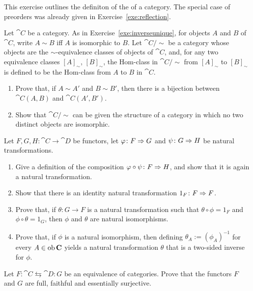   

\begin{exercise}\label{exe:skeleton}
This exercise outlines the definiton of the  of a category. The special case of preorders was already given in Exercise~\ref{exe:reflection}.

Let $\cat{C}$ be a category. As in Exercise~\ref{exe:inverseunique}, for objects $A$ and $B$ of $\cat{C}$, write $A \sim B$ iff $A$ is isomorphic to $B$. Let $\cat{C}/{\sim}$ be a category whose objects are the ${\sim}$-equivalence classes of objects of $\cat{C}$, and, for any two equivalence classes $[A]_{\sim}$, $[B]_{\sim}$, the Hom-class in $\cat{C}/{\sim}$ from $[A]_{\sim}$ to $[B]_{\sim}$ is defined to be the Hom-class from $A$ to $B$ in $\cat{C}$.
\begin{enumerate}
\item Prove that, if $A \sim A'$ and $B \sim B'$, then there is a bijection between $\cat{C}(A,B)$ and $\cat{C}(A',B')$. %
\item Show that $\cat{C}/{\sim}$ can be given the structure of a category in which no two distinct objects are isomorphic.
\end{enumerate}
\end{exercise}


\begin{exercise}\label{exe:naturaliso}
  Let $F, G, H \colon \cat{C} \to \cat{D}$ be functors, let $\varphi \colon F \Rightarrow G$ and $\psi \colon G \Rightarrow H$ be natural transformations.
  \begin{enumerate}
  \item Give a definition of the composition $\varphi \circ \psi \colon F \Rightarrow H$, and show that it is again a natural transformation.
    \item Show that there is an identity natural transformation $1_F \colon F \Rightarrow F$.
    \item Prove that, if $\theta \colon G \to F$ is a natural transformation such that $\theta \circ \phi = 1_F$ and $\phi \circ \theta = 1_G$, then $\phi$ and $\theta$ are natural isomorphisms.
      \item Prove that, if $\phi$ is a natural isomorphism, then defining $\theta_A := (\phi_A)^{-1}$ for every $A \in \operatorname{\mathrm{ob}} \mathbf{C}$ yields a natural transformation $\theta$ that is a two-sided inverse for $\phi$.
  \end{enumerate}
\end{exercise}


\begin{exercise}\label{exe:necequivalence}
Let $F \colon \cat{C} \leftrightarrows \cat{D} \colon G$ be an equivalence of categories. Prove that the functors $F$ and $G$ are full, faithful and essentially surjective.
\end{exercise}

